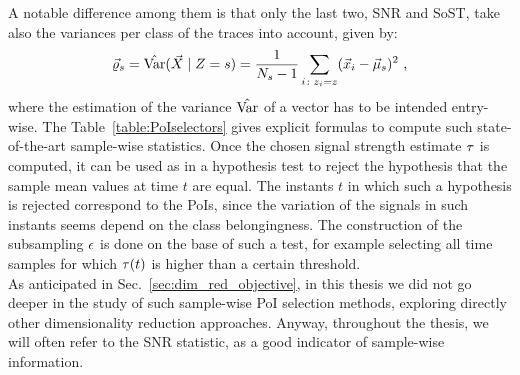 A notable difference among them is that only the last two, SNR and SoST, take also the variances per class of the traces into account, given by:
\begin{equation}
\varXclass = \varEst(\given{\vaLeakVec}{\sensRandVar = \sensVarGenValue}) = \frac{1}{\nbTracesPerClass-1}\sum_{i\colon \sensVar_i=\sensVar} (\vLeakVec_i - \mmmXclass)^2 \mbox{ ,}
\end{equation}
where the estimation of the variance $\hat{\mathrm{Var}}$ of a vector has to be intended entry-wise.
The Table~\ref{table:PoIselectors} gives explicit formulas to compute such state-of-the-art sample-wise statistics. Once the chosen signal strength estimate $\tau$ is computed, it can be used as in a hypothesis test to reject the hypothesis that the sample mean values at time $t$ are equal. The instants $t$ in which such a hypothesis is rejected correspond to the PoIs, since the variation of the signals in such instants seems depend on the class belongingness. The construction of the subsampling $\epsilon$ is done on the base of such a test, for example selecting all time samples for which $\tau(t)$ is higher than a certain threshold. \\

As anticipated in Sec.~\ref{sec:dim_red_objective}, in this thesis we did not go deeper in the study of such sample-wise PoI selection methods, exploring directly other dimensionality reduction approaches. Anyway, throughout the thesis, we will often refer to the SNR statistic, as a good indicator of sample-wise information.

